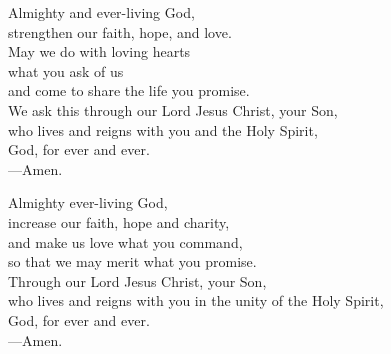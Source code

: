 \prayer


\begin{prayerverse}
Almighty and ever-living God,\\
strengthen our faith, hope, and love.\\
May we do with loving hearts\\
what you ask of us\\
and come to share the life you promise.\\
We ask this through our Lord Jesus Christ, your Son,\\
who lives and reigns with you and the Holy Spirit,\\
God, for ever and ever.\\
{\color{red}---\thinspace}Amen.
\end{prayerverse}


\begin{prayerverse}
Almighty ever-living God,\\
increase our faith, hope and charity,\\
and make us love what you command,\\
so that we may merit what you promise.\\
Through our Lord Jesus Christ, your Son,\\
who lives and reigns with you in the unity of the Holy Spirit,\\
God, for ever and ever.\\
{\color{red}---\thinspace}Amen.
\end{prayerverse}

